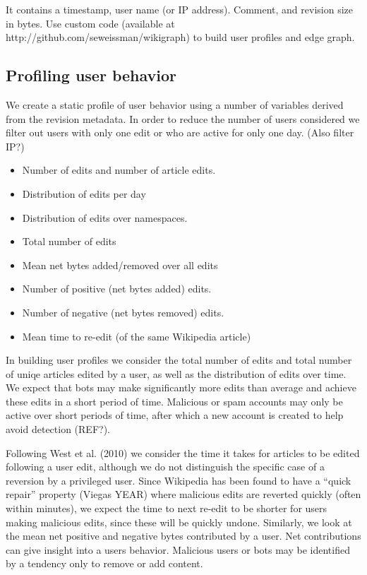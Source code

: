 \documentclass{article}
\begin{document}
It contains a timestamp, user name (or IP address). Comment, and revision size in bytes. Use custom code (available at http://github.com/seweissman/wikigraph) to build user profiles and edge graph. 

\subsection{Profiling user behavior}

We create a static profile of user behavior using a number of variables derived from the revision metadata. In order to reduce the number of users considered we filter out users with only one edit or who are active for only one day. (Also filter IP?)

\begin{itemize}
\item Number of edits and number of article edits.
\item Distribution of edits per day
\item Distribution of edits over namespaces.
\item Total number of edits
\item Mean net bytes added/removed over all edits
\item Number of positive (net bytes added) edits.
\item Number of negative (net bytes removed) edits.
\item Mean time to re-edit (of the same Wikipedia article)
\end{itemize}

In building user profiles we consider the total number of edits and total number of uniqe articles edited by a user, as well as the distribution of edits over time. We expect that bots may make significantly more edits than average and achieve these edits in a short period of time. Malicious or spam accounts may only be active over short periods of time, after which a new account is created to help avoid detection (REF?).

Following West et al. (2010) we consider the time it takes for articles to be edited following a user edit, although we do not distinguish the specific case of a reversion by a privileged user. Since Wikipedia has been found to have a ``quick repair'' property (Viegas YEAR) where malicious edits are reverted quickly (often within minutes), we expect the time to next re-edit to be shorter for users making malicious edits, since these will be quickly undone. Similarly, we look at the mean net positive and negative bytes contributed by a user. Net contributions can give insight into a users behavior. Malicious users or bots may be identified by a tendency only to remove or add content.
\end{document}
